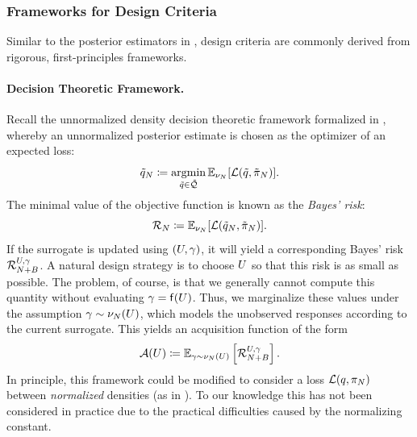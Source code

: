 \documentclass[12pt]{article}
\begin{document}
\subsubsection{Frameworks for Design Criteria}
Similar to the posterior estimators in , design criteria are commonly derived from rigorous, first-principles frameworks.

\paragraph{Decision Theoretic Framework.}
Recall the unnormalized density decision theoretic framework formalized in , whereby
an unnormalized posterior estimate is chosen as the optimizer of an expected loss:
\begin{equation}
\qDens_\Ndesign \Def \argmin_{\qDens \in \qSpace} \emE[\loss(\qDens, \postEm)].
\end{equation}
The minimal value of the objective function is known as the \textit{Bayes' risk}:
\begin{equation}
\bayesrisk \Def \emE[\loss(\qDens_\Ndesign, \postEm[\Ndesign])].
\end{equation}
If the surrogate is updated using $(\ParBatch, \batchResponse)$, it will yield a corresponding Bayes' risk
$\bayesrisk[\Naugment]^{\ParBatch,\batchResponse}$. A natural design strategy is to choose $\ParBatch$
so that this risk is as small as possible. The problem, of course, 
is that we generally cannot compute this quantity without evaluating $\batchResponse = \target(\ParBatch)$.
Thus, we marginalize these values under the assumption $\batchResponse \sim \emDist(\ParBatch)$, which
models the unobserved responses according to the current surrogate. This yields an acquisition function of the form 
\begin{equation}
\acq(\ParBatch) \Def \E_{\batchResponse \sim \emDist(\ParBatch)}\left[\bayesrisk[\Naugment]^{\ParBatch,\batchResponse}\right].
\end{equation} 
In principle, this framework could be modified to consider a loss
$\loss(\qDensNorm, \postNormEm)$ between \textit{normalized} densities (as in ).
To our knowledge this has not been considered in practice due to the practical difficulties caused by the normalizing constant.
\end{document}
